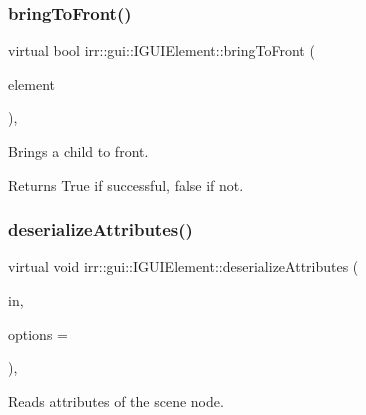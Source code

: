 \subsubsection{\texorpdfstring{bring\+To\+Front()}{bringToFront()}\hspace{0.1cm}{\footnotesize\ttfamily [2/2]}}
{\footnotesize\ttfamily virtual bool irr\+::gui\+::\+I\+G\+U\+I\+Element\+::bring\+To\+Front (\begin{DoxyParamCaption}\item[{\hyperlink{classirr_1_1gui_1_1IGUIElement}{I\+G\+U\+I\+Element} $\ast$}]{element }\end{DoxyParamCaption})\hspace{0.3cm}{\ttfamily [inline]}, {\ttfamily [virtual]}}



Brings a child to front. 

\begin{DoxyReturn}{Returns}
True if successful, false if not. 
\end{DoxyReturn}
\mbox{\label{classirr_1_1gui_1_1IGUIElement_af71b96163b8d95816cd9c80fbf413b4d}} 
\subsubsection{\texorpdfstring{deserialize\+Attributes()}{deserializeAttributes()}\hspace{0.1cm}{\footnotesize\ttfamily [1/2]}}
{\footnotesize\ttfamily virtual void irr\+::gui\+::\+I\+G\+U\+I\+Element\+::deserialize\+Attributes (\begin{DoxyParamCaption}\item[{\hyperlink{classirr_1_1io_1_1IAttributes}{io\+::\+I\+Attributes} $\ast$}]{in,  }\item[{\hyperlink{structirr_1_1io_1_1SAttributeReadWriteOptions}{io\+::\+S\+Attribute\+Read\+Write\+Options} $\ast$}]{options = {} }\end{DoxyParamCaption})\hspace{0.3cm}{\ttfamily [inline]}, {\ttfamily [virtual]}}



Reads attributes of the scene node. 

